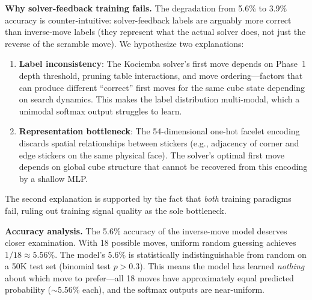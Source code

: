 \documentclass[conference]{IEEEtran}
\begin{document}
\begin{table}[htbp]
\centering
\caption{Retrained model (solver-feedback, 50K, 30 ep.): strategies vs.\ baseline (50 scrambles, seed 42, $K{=}5$).}
\label{tab:retrained}
\end{table}

\textbf{Why solver-feedback training fails.} The degradation from 5.6\% to 3.9\% accuracy is counter-intuitive: solver-feedback labels are arguably more correct than inverse-move labels (they represent what the actual solver does, not just the reverse of the scramble move). We hypothesize two explanations:

\begin{enumerate}[leftmargin=*]
  \item \textbf{Label inconsistency}: The Kociemba solver's first move depends on Phase~1 depth threshold, pruning table interactions, and move ordering---factors that can produce different ``correct'' first moves for the same cube state depending on search dynamics. This makes the label distribution multi-modal, which a unimodal softmax output struggles to learn.
  
  \item \textbf{Representation bottleneck}: The 54-dimensional one-hot facelet encoding discards spatial relationships between stickers (e.g., adjacency of corner and edge stickers on the same physical face). The solver's optimal first move depends on global cube structure that cannot be recovered from this encoding by a shallow MLP.
\end{enumerate}

The second explanation is supported by the fact that \emph{both} training paradigms fail, ruling out training signal quality as the sole bottleneck.

\textbf{Accuracy analysis.} The 5.6\% accuracy of the inverse-move model deserves closer examination. With 18 possible moves, uniform random guessing achieves $1/18 \approx 5.56\%$. The model's 5.6\% is statistically indistinguishable from random on a 50K test set (binomial test $p > 0.3$). This means the model has learned \emph{nothing} about which move to prefer---all 18 moves have approximately equal predicted probability ($\sim$5.56\% each), and the softmax outputs are near-uniform.
\end{document}
